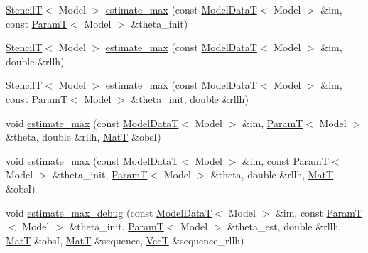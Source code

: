 \begin{DoxyCompactItemize}
\item 
\hyperlink{namespacemappel_a3a06598240007876f8c4bf834ad86197}{StencilT}$<$ Model $>$ \hyperlink{classmappel_1_1Estimator_aa8aa62047bfc28b1df3a9261da4f38a1}{estimate\+\_\+max} (const \hyperlink{namespacemappel_a97f050df953605381ae9c901c3b125f1}{Model\+DataT}$<$ Model $>$ \&im, const \hyperlink{namespacemappel_a667925cb0d6c0e49f2f035cc5a9a6857}{ParamT}$<$ Model $>$ \&theta\+\_\+init)
\item 
\hyperlink{namespacemappel_a3a06598240007876f8c4bf834ad86197}{StencilT}$<$ Model $>$ \hyperlink{classmappel_1_1Estimator_ab1be1fb34a71f9a46700c9d455fd5daf}{estimate\+\_\+max} (const \hyperlink{namespacemappel_a97f050df953605381ae9c901c3b125f1}{Model\+DataT}$<$ Model $>$ \&im, double \&rllh)
\item 
\hyperlink{namespacemappel_a3a06598240007876f8c4bf834ad86197}{StencilT}$<$ Model $>$ \hyperlink{classmappel_1_1Estimator_a2544f56248cb0f0763c964ddfaad32cc}{estimate\+\_\+max} (const \hyperlink{namespacemappel_a97f050df953605381ae9c901c3b125f1}{Model\+DataT}$<$ Model $>$ \&im, const \hyperlink{namespacemappel_a667925cb0d6c0e49f2f035cc5a9a6857}{ParamT}$<$ Model $>$ \&theta\+\_\+init, double \&rllh)
\item 
void \hyperlink{classmappel_1_1Estimator_a79f2d1c46789fed681985bb670e5ca37}{estimate\+\_\+max} (const \hyperlink{namespacemappel_a97f050df953605381ae9c901c3b125f1}{Model\+DataT}$<$ Model $>$ \&im, \hyperlink{namespacemappel_a667925cb0d6c0e49f2f035cc5a9a6857}{ParamT}$<$ Model $>$ \&theta, double \&rllh, \hyperlink{namespacemappel_a7091ab87c528041f7e2027195fad8915}{MatT} \&obsI)
\item 
void \hyperlink{classmappel_1_1Estimator_a8f85cf26c72c34d0071ccd2f8bb56abd}{estimate\+\_\+max} (const \hyperlink{namespacemappel_a97f050df953605381ae9c901c3b125f1}{Model\+DataT}$<$ Model $>$ \&im, const \hyperlink{namespacemappel_a667925cb0d6c0e49f2f035cc5a9a6857}{ParamT}$<$ Model $>$ \&theta\+\_\+init, \hyperlink{namespacemappel_a667925cb0d6c0e49f2f035cc5a9a6857}{ParamT}$<$ Model $>$ \&theta, double \&rllh, \hyperlink{namespacemappel_a7091ab87c528041f7e2027195fad8915}{MatT} \&obsI)
\item 
void \hyperlink{classmappel_1_1Estimator_a4a581372a320f1c13eeffacf6309911b}{estimate\+\_\+max\+\_\+debug} (const \hyperlink{namespacemappel_a97f050df953605381ae9c901c3b125f1}{Model\+DataT}$<$ Model $>$ \&im, const \hyperlink{namespacemappel_a667925cb0d6c0e49f2f035cc5a9a6857}{ParamT}$<$ Model $>$ \&theta\+\_\+init, \hyperlink{namespacemappel_a667925cb0d6c0e49f2f035cc5a9a6857}{ParamT}$<$ Model $>$ \&theta\+\_\+est, double \&rllh, \hyperlink{namespacemappel_a7091ab87c528041f7e2027195fad8915}{MatT} \&obsI, \hyperlink{namespacemappel_a7091ab87c528041f7e2027195fad8915}{MatT} \&sequence, \hyperlink{namespacemappel_a2225ad69f358daa3f4f99282a35b9a3a}{VecT} \&sequence\+\_\+rllh)
\end{DoxyCompactItemize}
